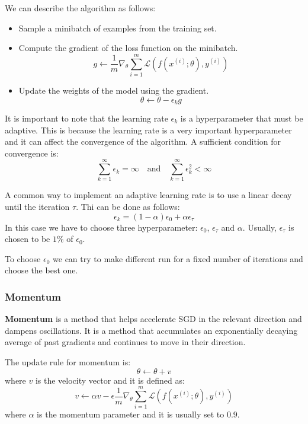 We can describe the algorithm as follows:
\begin{itemize}
    \item Sample a minibatch of examples from the training set.
    \item Compute the gradient of the loss function on the minibatch.
          \begin{equation}
              g \gets \frac{1}{m} \nabla_\theta \sum_{i=1}^m \mathcal{L}(f(x^{(i)}; \theta), y^{(i)})
          \end{equation}
    \item Update the weights of the model using the gradient.
          \begin{equation}
              \theta \gets \theta - \epsilon_k g
          \end{equation}
\end{itemize}
It is important to note that the learning rate $\epsilon_k$ is a hyperparameter
that must be adaptive. This is because the learning rate is a very important
hyperparameter and it can affect the convergence of the algorithm. A sufficient
condition for convergence is:
\begin{equation*}
    \sum_{k=1}^\infty \epsilon_k = \infty \quad \text{and} \quad \sum_{k=1}^\infty \epsilon_k^2 < \infty
\end{equation*}

A common way to implement an adaptive learning rate is to use a linear decay
until the iteration $\tau$. Thi can be done as follows:
\begin{equation}
    \epsilon_k = \left(1 - \alpha\right)\epsilon_0 + \alpha \epsilon_\tau
\end{equation}
In this case we have to choose three hyperparameter: $\epsilon_0$, $\epsilon_\tau$
and $\alpha$. Usually, $\epsilon_\tau$ is chosen to be $1\%$ of $\epsilon_0$.

To choose $\epsilon_0$ we can try to make different run for a fixed number of
iterations and choose the best one.
\subsubsection{Momentum}
\textbf{Momentum} is a method that helps accelerate SGD in the relevant direction
and dampens oscillations. It is a method that accumulates an exponentially decaying
average of past gradients and continues to move in their direction.

The update rule for momentum is:
\begin{equation}
    \theta \gets \theta + v
\end{equation}
where $v$ is the velocity vector and it is defined as:
\begin{equation}
    v \gets \alpha v - \epsilon \frac{1}{m} \nabla_\theta \sum_{i=1}^m \mathcal{L}(f(x^{(i)}; \theta), y^{(i)})
\end{equation}
where $\alpha$ is the momentum parameter and it is usually set to $0.9$.

